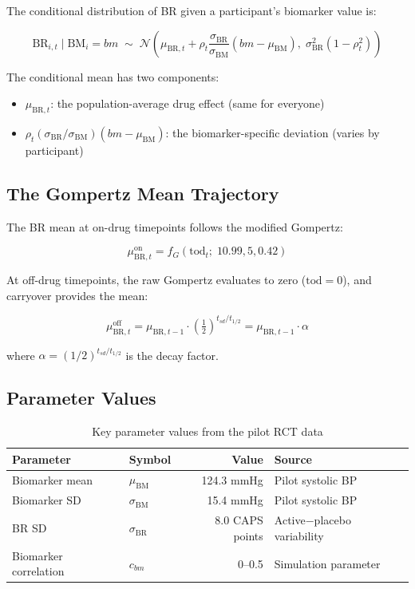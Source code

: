 \documentclass[11pt]{article}
\begin{document}
The conditional distribution of BR given a participant's
biomarker value is:

\begin{equation}
\text{BR}_{i,t} \mid \text{BM}_i = bm \;\sim\;
\mathcal{N}\!\left(
  \mu_{\text{BR},t} +
  \rho_t \frac{\sigma_{\text{BR}}}{\sigma_{\text{BM}}}
  (bm - \mu_{\text{BM}}),\;
  \sigma_{\text{BR}}^2 (1 - \rho_t^2)
\right)
\label{eq:conditional}
\end{equation}

The conditional mean has two components:

\begin{itemize}
\item $\mu_{\text{BR},t}$: the population-average drug effect
  (same for everyone)
\item $\rho_t (\sigma_{\text{BR}} / \sigma_{\text{BM}})
  (bm - \mu_{\text{BM}})$: the biomarker-specific deviation
  (varies by participant)
\end{itemize}

\subsection{The Gompertz Mean Trajectory}

The BR mean at on-drug timepoints follows the modified Gompertz:

\[
\mu_{\text{BR},t}^{\text{on}} =
  f_G(\text{tod}_t;\; 10.99, 5, 0.42)
\]

At off-drug timepoints, the raw Gompertz evaluates to zero
($\text{tod} = 0$), and carryover provides the mean:

\[
\mu_{\text{BR},t}^{\text{off}} =
  \mu_{\text{BR},t-1} \cdot
  \left(\tfrac{1}{2}\right)^{t_{sd} / t_{1/2}}
= \mu_{\text{BR},t-1} \cdot \alpha
\]

where $\alpha = (1/2)^{t_{sd}/t_{1/2}}$ is the decay factor.

\subsection{Parameter Values}

\begin{table}[h]
\centering
\caption{Key parameter values from the pilot RCT data}
\begin{tabular}{llrl}
\toprule
Parameter & Symbol & Value & Source \\
\midrule
Biomarker mean & $\mu_{\text{BM}}$ & 124.3 mmHg &
  Pilot systolic BP \\
Biomarker SD & $\sigma_{\text{BM}}$ & 15.4 mmHg &
  Pilot systolic BP \\
BR SD & $\sigma_{\text{BR}}$ & 8.0 CAPS points &
  Active$-$placebo variability \\
Biomarker correlation & $c_{bm}$ & 0--0.5 &
  Simulation parameter \\
\bottomrule
\end{tabular}
\end{table}
\end{document}
